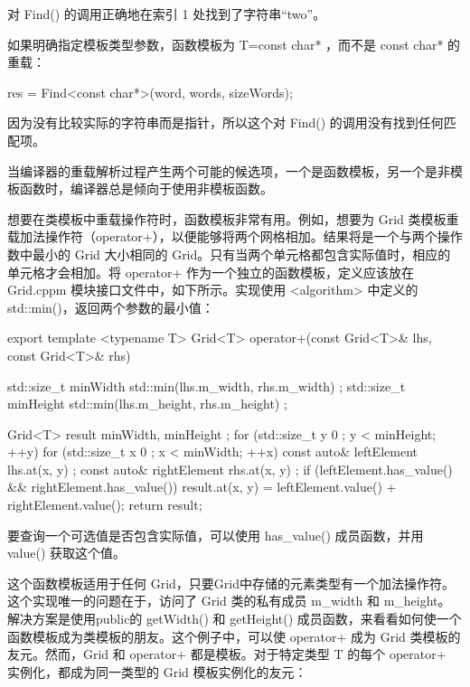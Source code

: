 对 Find() 的调用正确地在索引 1 处找到了字符串“two”。

如果明确指定模板类型参数，函数模板为 T=const char* ，而不是 const char* 的重载：

\begin{cpp}
res = Find<const char*>(word, words, sizeWords);
\end{cpp}

因为没有比较实际的字符串而是指针，所以这个对 Find() 的调用没有找到任何匹配项。

当编译器的重载解析过程产生两个可能的候选项，一个是函数模板，另一个是非模板函数时，编译器总是倾向于使用非模板函数。


想要在类模板中重载操作符时，函数模板非常有用。例如，想要为 Grid 类模板重载加法操作符（operator+），以便能够将两个网格相加。结果将是一个与两个操作数中最小的 Grid 大小相同的 Grid。只有当两个单元格都包含实际值时，相应的单元格才会相加。将 operator+ 作为一个独立的函数模板，定义应该放在 Grid.cppm 模块接口文件中，如下所示。实现使用 <algorithm> 中定义的 std::min()，返回两个参数的最小值：

\begin{cpp}
export template <typename T>
Grid<T> operator+(const Grid<T>& lhs, const Grid<T>& rhs)
{
    std::size_t minWidth { std::min(lhs.m_width, rhs.m_width) };
    std::size_t minHeight { std::min(lhs.m_height, rhs.m_height) };

    Grid<T> result { minWidth, minHeight };
    for (std::size_t y { 0 }; y < minHeight; ++y) {
        for (std::size_t x { 0 }; x < minWidth; ++x) {
            const auto& leftElement { lhs.at(x, y) };
            const auto& rightElement { rhs.at(x, y) };
            if (leftElement.has_value() && rightElement.has_value()) {
                result.at(x, y) = leftElement.value() + rightElement.value();
            }
        }
    }
    return result;
}
\end{cpp}

要查询一个可选值是否包含实际值，可以使用 has\_value() 成员函数，并用 value() 获取这个值。

这个函数模板适用于任何 Grid，只要Grid中存储的元素类型有一个加法操作符。这个实现唯一的问题在于，访问了 Grid 类的私有成员 m\_width 和 m\_height。解决方案是使用public的 getWidth() 和 getHeight() 成员函数，来看看如何使一个函数模板成为类模板的朋友。这个例子中，可以使 operator+ 成为 Grid 类模板的友元。然而，Grid 和 operator+ 都是模板。对于特定类型 T 的每个 operator+ 实例化，都成为同一类型的 Grid 模板实例化的友元：


